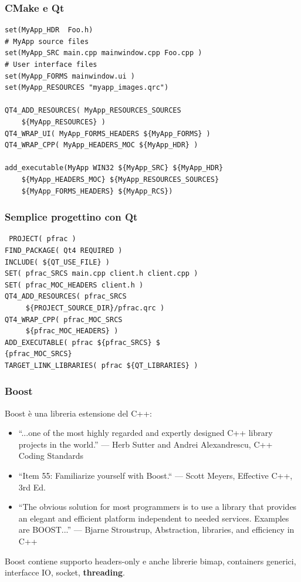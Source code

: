 \documentclass[10pt] {beamer}
\begin{document}
\begin{frame}[fragile]
 \frametitle{CMake e Qt}
\begin{footnotesize}
\begin{verbatim}
set(MyApp_HDR  Foo.h)
# MyApp source files
set(MyApp_SRC main.cpp mainwindow.cpp Foo.cpp )
# User interface files
set(MyApp_FORMS mainwindow.ui ) 
set(MyApp_RESOURCES "myapp_images.qrc")

QT4_ADD_RESOURCES( MyApp_RESOURCES_SOURCES 
    ${MyApp_RESOURCES} )
QT4_WRAP_UI( MyApp_FORMS_HEADERS ${MyApp_FORMS} )
QT4_WRAP_CPP( MyApp_HEADERS_MOC ${MyApp_HDR} )

add_executable(MyApp WIN32 ${MyApp_SRC} ${MyApp_HDR}
    ${MyApp_HEADERS_MOC} ${MyApp_RESOURCES_SOURCES}
    ${MyApp_FORMS_HEADERS} ${MyApp_RCS})
\end{verbatim}
\end{footnotesize}
\end{frame}

\begin{frame}[fragile]
 \frametitle{Semplice progettino con Qt}
\begin{verbatim}
 PROJECT( pfrac )
FIND_PACKAGE( Qt4 REQUIRED )
INCLUDE( ${QT_USE_FILE} )
SET( pfrac_SRCS main.cpp client.h client.cpp )
SET( pfrac_MOC_HEADERS client.h )
QT4_ADD_RESOURCES( pfrac_SRCS 
     ${PROJECT_SOURCE_DIR}/pfrac.qrc )
QT4_WRAP_CPP( pfrac_MOC_SRCS 
     ${pfrac_MOC_HEADERS} )
ADD_EXECUTABLE( pfrac ${pfrac_SRCS} $
{pfrac_MOC_SRCS} 
TARGET_LINK_LIBRARIES( pfrac ${QT_LIBRARIES} )
\end{verbatim}

\end{frame}


\begin{frame}[fragile]
\frametitle{Boost}
Boost è una libreria estensione del C++:
\begin{itemize}
\item ``...one of the most highly regarded and expertly designed C++ library projects in the world.''
— Herb Sutter and Andrei Alexandrescu, C++ Coding Standards
\item ``Item 55: Familiarize yourself with Boost.``
— Scott Meyers, Effective C++, 3rd Ed.
\item ``The obvious solution for most programmers is to use a library that provides an elegant and efficient platform independent to needed services. Examples are BOOST...''
— Bjarne Stroustrup, Abstraction, libraries, and efficiency in C++
\end{itemize}
Boost contiene supporto headers-only e anche librerie bimap, containers generici, interfacce IO, socket, \textbf{threading}.
\end{frame}
\end{document}

